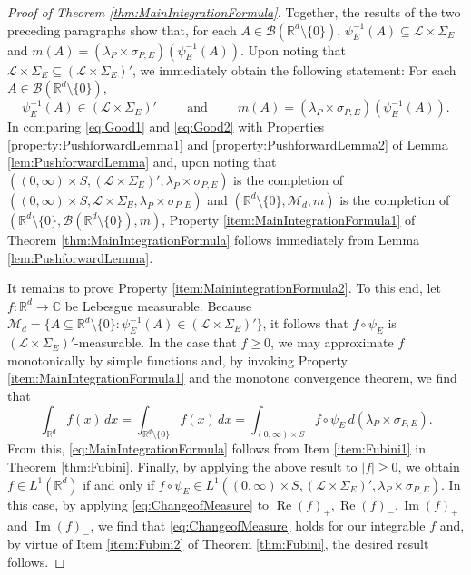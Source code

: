 \documentclass[11pt]{article}
\theoremstyle{remark}
\renewcommand\Re{\operatorname{Re}}%
\renewcommand\Im{\operatorname{Im}}
\begin{document}
\begin{proof}[Proof of Theorem \ref{thm:MainIntegrationFormula}]
Together, the results of the two preceding paragraphs show that, for each $A\in\mathcal{B}(\mathbb{R}^d\setminus\{0\})$, $\psi_E^{-1}(A)\subseteq \mathcal{L}\times\Sigma_E$ and $m(A)=(\lambda_P\times\sigma_{P,E})(\psi_E^{-1}(A))$. Upon noting that $\mathcal{L}\times\Sigma_E\subseteq (\mathcal{L}\times\Sigma_E)'$, we immediately obtain the following statement: For each $A\in\mathcal{B}(\mathbb{R}^d\setminus\{0\})$,
\begin{equation}\label{eq:Good2}
\psi_E^{-1}(A)\in (\mathcal{L}\times\Sigma_E)'\hspace{1cm}\mbox{and}\hspace{1cm}m(A)=(\lambda_P\times\sigma_{P,E})(\psi_E^{-1}(A)).
\end{equation}
In comparing \eqref{eq:Good1} and \eqref{eq:Good2} with Properties \ref{property:PushforwardLemma1} and \ref{property:PushforwardLemma2} of Lemma \ref{lem:PushforwardLemma} and, upon noting that $((0,\infty)\times S,(\mathcal{L}\times\Sigma_E)',\lambda_P\times\sigma_{P,E})$ is the completion of $((0,\infty)\times S,\mathcal{L}\times\Sigma_E,\lambda_P\times\sigma_{P,E})$ and $(\mathbb{R}^d\setminus\{0\},\mathcal{M}_d,m)$ is the completion of $(\mathbb{R}^d\setminus\{0\},\mathcal{B}(\mathbb{R}^d\setminus\{0\}),m)$, Property \ref{item:MainIntegrationFormula1} of Theorem \ref{thm:MainIntegrationFormula} follows immediately from Lemma \ref{lem:PushforwardLemma}.

It remains to prove Property \ref{item:MainintegrationFormula2}. To this end, let $f:\mathbb{R}^d\to\mathbb{C}$ be Lebesgue measurable. Because $\mathcal{M}_d=\{A\subseteq \mathbb{R}^d\setminus\{0\}:\psi_E^{-1}(A)\in(\mathcal{L}\times\Sigma_E)'\}$, it follows that $f\circ\psi_E$ is $(\mathcal{L}\times\Sigma_E)'$-measurable. In the case that $f\geq 0$, we may approximate $f$ monotonically by simple functions and, by invoking Property \ref{item:MainIntegrationFormula1} and the monotone convergence theorem, we find that
\begin{equation}\label{eq:ChangeofMeasure}
\int_{\mathbb{R}^d}f(x)\,dx=\int_{\mathbb{R}^d\setminus \{0\}}f(x)\,dx=\int_{(0,\infty)\times S}f\circ \psi_E\, d(\lambda_P\times\sigma_{P,E}).
\end{equation}
From this, \eqref{eq:MainIntegrationFormula} follows from Item \ref{item:Fubini1} in Theorem \ref{thm:Fubini}. Finally, by applying the above result to $|f|\geq 0$, we obtain $f\in L^1(\mathbb{R}^d)$ if and only if $f\circ \psi_E\in L^1((0,\infty)\times S,(\mathcal{L}\times\Sigma_E)',\lambda_P\times\sigma_{P,E})$. In this case, by applying \eqref{eq:ChangeofMeasure} to $\Re(f)_+,\Re(f)_-,\Im(f)_+$ and $\Im(f)_-$, we find that \eqref{eq:ChangeofMeasure} holds for our integrable $f$ and, by virtue of Item  \ref{item:Fubini2} of Theorem \ref{thm:Fubini}, the desired result follows.
\end{proof}
\end{document}

